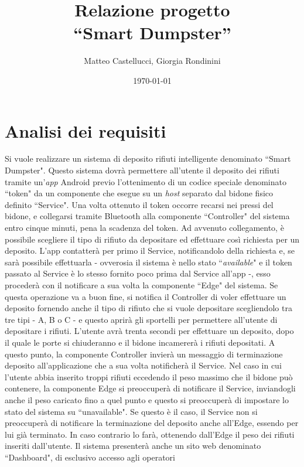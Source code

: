 \documentclass[a4paper, 12pt]{report}
\title{Relazione progetto\\``Smart Dumpster''}
\author{Matteo Castellucci, Giorgia Rondinini}
\date{\today}
\begin{document}
	\maketitle
	\tableofcontents
	\chapter{Analisi dei requisiti}
	Si vuole realizzare un sistema di deposito rifiuti intelligente denominato ``Smart Dumpster".\newline
	Questo sistema dovrà permettere all'utente il deposito dei rifiuti tramite un'\textit{app} Android
	previo l'ottenimento di un codice speciale denominato ``token" da un componente che esegue su un
	\textit{host} separato dal bidone fisico definito ``Service". Una volta ottenuto il token occorre
	recarsi nei pressi del bidone, e collegarsi tramite Bluetooth alla componente ``Controller" del
	sistema entro cinque minuti, pena la scadenza del token. Ad avvenuto collegamento, è
	possibile scegliere il tipo di rifiuto da depositare ed
	effettuare così richiesta per un deposito. L'app contatterà per primo il Service, notificandolo della
	richiesta e, se sarà possibile effettuarla - ovverosia il sistema è nello stato ``\textit{available}"
	e il token passato al Service è lo stesso fornito poco prima dal Service all'app -, esso procederà
	con il notificare a sua volta la componente ``Edge" del sistema. Se questa operazione va a buon fine, 
	si notifica il Controller di voler effettuare un deposito fornendo anche il tipo di rifiuto che si
	vuole depositare scegliendolo tra tre tipi - A, B o C - e questo aprirà gli sportelli per permettere
	all'utente di depositare i rifiuti. L'utente
	avrà trenta secondi per effettuare un deposito, dopo il quale le porte si chiuderanno e il bidone
	incamererà i rifiuti depositati. A questo punto, la componente Controller invierà un messaggio di
	terminazione deposito all'applicazione che a sua volta notificherà il Service. Nel caso in cui
	l'utente abbia inserito troppi rifiuti eccedendo il peso massimo che il bidone può contenere, la
	componente Edge si preoccuperà di notificare il Service, inviandogli anche il peso caricato fino a
	quel punto e questo si preoccuperà di impostare lo stato del sistema su ``unavailable". Se questo è
	il caso, il Service non si preoccuperà di notificare la terminazione del deposito anche all'Edge,
	essendo per lui già terminato. In caso contrario lo farà, ottenendo dall'Edge il peso dei rifiuti
	inseriti dall'utente.\newline
	Il sistema presenterà anche un sito web denominato ``Dashboard", di esclusivo accesso agli operatori
\end{document}
